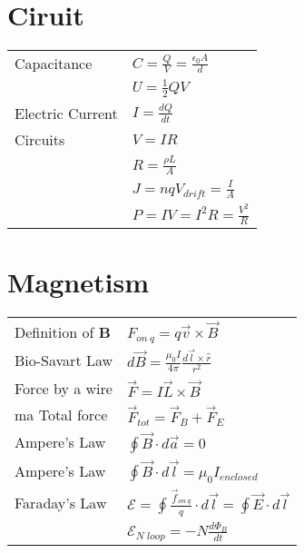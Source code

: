 \documentclass[5pt]{article}
\begin{document}
\begin{multicols}{2}
\section{Ciruit}
\begin{tabular}{ll}
Capacitance      & $C=\frac{Q}{V}=\frac{\epsilon_0A}{d}$\\
                 & $U=\frac{1}{2}QV$\\
Electric Current & $I=\frac{dQ}{dt}$\\
Circuits         & $V=IR$\\
                 & $R=\frac{\rho L}{A}$\\
                 & $J=nqV_{drift}=\frac{I}{A}$\\
                 & $P=IV=I^2R=\frac{V^2}{R}$\\
\end{tabular}


\section{Magnetism}
\begin{tabular}{ll}
Definition of \textbf{B} & $F_{on\:q}=q\vec{v}\times\vec{B}$\\
Bio-Savart Law & $d\vec{B}=\frac{\mu_0I}{4\pi}\frac{d\vec{l}\times\hat{r}}{r^2}$\\
Force by a wire & $\vec{F}=I\vec{L}\times\vec{B}$\\
ma
Total force & $\vec{F}_{tot}=\vec{F}_{B} + \vec{F}_{E}$\\
Ampere's Law & $\oint\vec{B}\cdot d\vec{a}=0$\\
Ampere's Law & $\oint\vec{B}\cdot d\vec{l}=\mu_0I_{enclosed}$\\
Faraday's Law & $\mathcal{E}=\oint \frac{\vec{f}_{on\:q}}{q}\cdot d\vec{l}=\oint \vec{E}\cdot d\vec{l}$\\
              & $\mathcal{E}_{N\;loop}=-N\frac{d\Phi_B}{dt}$\\
              

\end{tabular}



\end{multicols}
\end{document}
